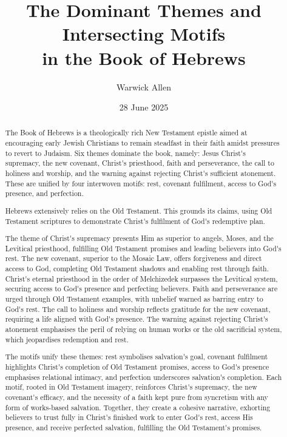\documentclass[12pt]{article}
\title{The Dominant Themes and Intersecting Motifs \\ in the Book of Hebrews}
\author{Warwick Allen}
\date{28 June 2025}
\def\apos{^^27}         %
\def\jesus{Yeshua}
\def\christ{the Messiah}
\def\Christ{The Messiah}
\def\jesus{Jesus}
\def\christ{Christ}
\def\Christ{Christ}
\begin{document}
\maketitle

\begin{abstract}
The Book of Hebrews is a theologically rich New Testament epistle aimed at
encouraging early Jewish Christians to remain steadfast in their faith amidst
pressures to revert to Judaism.
%
Six themes dominate the book, namely: \jesus{} \christ{}\apos{}s supremacy, the
new covenant, \christ{}\apos{}s priesthood, faith and perseverance, the call to
holiness and worship, and the warning against rejecting \christ{}\apos{}s
sufficient atonement.
%
These are unified by four interwoven motifs: rest, covenant fulfilment, access
to God\apos{}s presence, and perfection.

Hebrews extensively relies on the Old Testament.
%
This grounds its claims, using Old Testament scriptures to demonstrate
\christ{}\apos{}s fulfilment of God\apos{}s redemptive plan.

The theme of \christ{}\apos{}s supremacy presents Him as superior to angels,
Moses, and the Levitical priesthood, fulfilling Old Testament promises and
leading believers into God\apos{}s rest.
%
The new covenant, superior to the Mosaic Law, offers forgiveness and direct
access to God, completing Old Testament shadows and enabling rest through faith.
%
\Christ{}\apos{}s eternal priesthood in the order of Melchizedek surpasses the
Levitical system, securing access to God\apos{}s presence and perfecting
believers.
%
Faith and perseverance are urged through Old Testament examples, with unbelief
warned as barring entry to God\apos{}s rest. The call to holiness and worship
reflects gratitude for the new covenant, requiring a life aligned with
God\apos{}s presence.
%
The warning against rejecting \christ{}\apos{}s atonement emphasises the peril
of relying on human works or the old sacrificial system, which jeopardises
redemption and rest.

The motifs unify these themes: rest symbolises salvation\apos{}s goal, covenant
fulfilment highlights \christ{}\apos{}s completion of Old Testament promises,
access to God\apos{}s presence emphasises relational intimacy, and perfection
underscores salvation\apos{}s completion.
%
Each motif, rooted in Old Testament imagery, reinforces \christ{}\apos{}s
supremacy, the new covenant\apos{}s efficacy, and the necessity of a faith kept
pure from syncretism with any form of works-based salvation.
%
Together, they create a cohesive narrative, exhorting believers to trust fully
in \christ{}\apos{}s finished work to enter God\apos{}s rest, access His
presence, and receive perfected salvation, fulfilling the Old Testament\apos{}s
promises.
\end{abstract}
\end{document}
